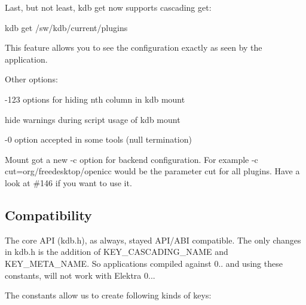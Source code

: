 Last, but not least, kdb get now supports cascading get\+:


\begin{DoxyCode}
kdb get /sw/kdb/current/plugins
\end{DoxyCode}


This feature allows you to see the configuration exactly as seen by the application.

Other options\+:


\begin{DoxyItemize}
\item -\/123 options for hiding nth column in {\ttfamily kdb mount}
\item hide warnings during script usage of {\ttfamily kdb mount}
\item -\/0 option accepted in some tools (null termination)
\item Mount got a new -\/c option for backend configuration. For example -\/c cut=org/freedesktop/openicc would be the parameter cut for all plugins. Have a look at \#146 if you want to use it.
\end{DoxyItemize}

\subsection*{Compatibility}

The core A\+PI (kdb.\+h), as always, stayed A\+P\+I/\+A\+BI compatible. The only changes in kdb.\+h is the addition of {\ttfamily K\+E\+Y\+\_\+\+C\+A\+S\+C\+A\+D\+I\+N\+G\+\_\+\+N\+A\+ME} and {\ttfamily K\+E\+Y\+\_\+\+M\+E\+T\+A\+\_\+\+N\+A\+ME}. So applications compiled against 0.. and using these constants, will not work with Elektra 0...

The constants allow us to create following kinds of keys\+:



